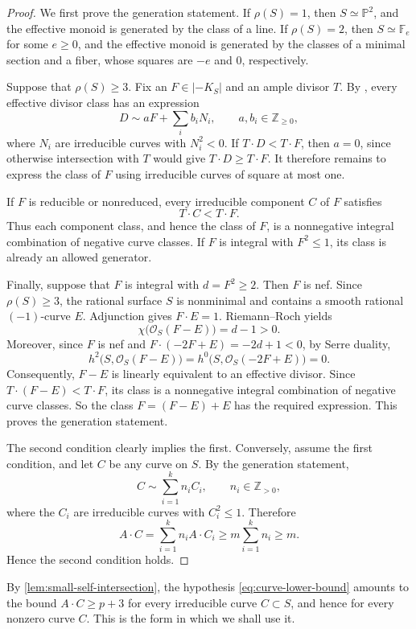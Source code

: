\documentclass[11pt,reqno]{amsart}
\numberwithin{equation}{section}
\theoremstyle{remark}
\begin{document}
\begin{proof}
We first prove the generation statement. If \(\rho(S)=1\), then
\(S\simeq\mathbb P^2\), and the effective monoid is generated by
the class of a line. If \(\rho(S)=2\), then
\(S\simeq\mathbb F_e\) for some $e\ge 0$, and the effective monoid is generated by
the classes of a minimal section and a fiber, whose squares are $-e$ and $0$, respectively.

Suppose that \(\rho(S)\geq3\). Fix an \(F\in|-K_S|\)
and an ample divisor \(T\). By
\cite[Lemma 4.1]{LahyaneHarbourne}, every effective divisor
class has an expression
\[
    D\sim aF+\sum_i b_iN_i,
    \qquad a,b_i\in\mathbb Z_{\geq0},
\]
where \(N_i\) are irreducible curves with \(N_i^2<0\).
If \(T\cdot D<T\cdot F\), then \(a=0\), since otherwise
intersection with \(T\) would give \(T\cdot D\geq T\cdot F\).
It therefore remains to express the class of \(F\) using
irreducible curves of square at most one.

If \(F\) is reducible or nonreduced, every irreducible component
\(C\) of \(F\) satisfies
\[
    T\cdot C<T\cdot F.
\]
Thus each component class, and hence the class of \(F\), is a
nonnegative integral combination of negative curve classes.
If \(F\) is integral with \(F^2\leq1\), its class is already
an allowed generator.

Finally, suppose that \(F\) is integral with \(d=F^2\geq2\).
Then \(F\) is nef. Since \(\rho(S)\geq3\), the rational surface
\(S\) is nonminimal and contains a smooth rational
\((-1)\)-curve \(E\). Adjunction gives \(F\cdot E=1\).
Riemann--Roch yields
\[
    \chi\bigl(\mathcal O_S(F-E)\bigr)=d-1>0.
\]
Moreover, since \(F\) is nef and $F\cdot(-2F+E)=-2d+1<0$, by Serre duality,
\[
    h^2\bigl(S,\mathcal O_S(F-E)\bigr)
    =h^0\bigl(S,\mathcal O_S(-2F+E)\bigr)=0.
\]
Consequently, \(F-E\) is linearly equivalent to an effective
divisor. Since \(T\cdot(F-E)<T\cdot F\), its class is a
nonnegative integral combination of negative curve classes. So the class $F=(F-E)+E$ has the required expression. This proves the generation statement.

The second condition clearly implies the first. Conversely,
assume the first condition, and let \(C\) be any curve on \(S\).
By the generation statement,
\[
    C\sim\sum_{i=1}^{k}n_iC_i,
    \qquad n_i\in\mathbb Z_{>0},
\]
where the \(C_i\) are irreducible curves with $C_i^2\leq1$. Therefore
\[
    A\cdot C
    =\sum_{i=1}^{k}n_i A\cdot C_i
    \geq m\sum_{i=1}^{k}n_i
    \geq m.
\]
Hence the second condition holds.
\end{proof}
By \cref{lem:small-self-intersection}, the hypothesis \eqref{eq:curve-lower-bound} amounts to the bound \(A\cdot C\geq p+3\) for every irreducible curve \(C\subset S\), and hence for every nonzero curve \(C\). This is the form in which we shall use it.
\end{document}
